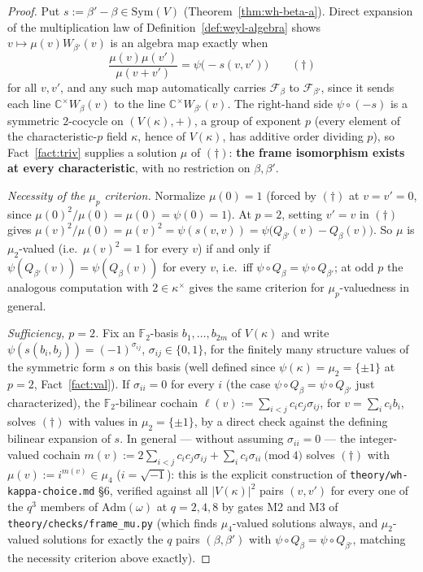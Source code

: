 \begin{proof}
Put $s:=\beta'-\beta\in\mathrm{Sym}(V)$ (Theorem~\ref{thm:wh-beta-a}). Direct
expansion of the multiplication law of Definition~\ref{def:weyl-algebra}
shows $v\mapsto\mu(v)W_{\beta'}(v)$ is an algebra map exactly when
\[
\frac{\mu(v)\mu(v')}{\mu(v+v')} = \psi\big({-}s(v,v')\big) \qquad(\dagger)
\]
for all $v,v'$, and any such map automatically carries $\mathcal{F}_\beta$
to $\mathcal{F}_{\beta'}$, since it sends each line
$\mathbb{C}^\times W_\beta(v)$ to the line $\mathbb{C}^\times W_{\beta'}(v)$.
The right-hand side $\psi\circ(-s)$ is a symmetric $2$-cocycle on
$(V(\kappa),+)$, a group of exponent $p$ (every element of the
characteristic-$p$ field $\kappa$, hence of $V(\kappa)$, has additive order
dividing $p$), so Fact~\ref{fact:triv} supplies a solution $\mu$ of
$(\dagger)$: \textbf{the frame isomorphism exists at every characteristic},
with no restriction on $\beta,\beta'$.

\emph{Necessity of the $\mu_p$ criterion.} Normalize $\mu(0)=1$ (forced by
$(\dagger)$ at $v=v'=0$, since $\mu(0)^2/\mu(0)=\mu(0)=\psi(0)=1$). At
$p=2$, setting $v'=v$ in $(\dagger)$ gives $\mu(v)^2/\mu(0)=\mu(v)^2=\psi(s(v,v))=\psi\big(Q_{\beta'}(v)-Q_\beta(v)\big)$.
So $\mu$ is $\mu_2$-valued (i.e.\ $\mu(v)^2=1$ for every $v$) if and only if
$\psi(Q_{\beta'}(v))=\psi(Q_\beta(v))$ for every $v$, i.e.\ iff
$\psi\circ Q_\beta=\psi\circ Q_{\beta'}$; at odd $p$ the analogous
computation with $2\in\kappa^\times$ gives the same criterion for
$\mu_p$-valuedness in general.

\emph{Sufficiency, $p=2$.} Fix an $\mathbb{F}_2$-basis $b_1,\dots,b_{2m}$ of
$V(\kappa)$ and write $\psi(s(b_i,b_j))=(-1)^{\sigma_{ij}}$,
$\sigma_{ij}\in\{0,1\}$, for the finitely many structure values of the
symmetric form $s$ on this basis (well defined since
$\psi(\kappa)=\mu_2=\{\pm 1\}$ at $p=2$, Fact~\ref{fact:val}). If
$\sigma_{ii}=0$ for every $i$ (the case $\psi\circ Q_\beta=\psi\circ Q_{\beta'}$
just characterized), the $\mathbb{F}_2$-bilinear cochain
$\ell(v):=\sum_{i<j}c_ic_j\sigma_{ij}$, for $v=\sum_i c_ib_i$, solves
$(\dagger)$ with values in $\mu_2=\{\pm 1\}$, by a direct check against the
defining bilinear expansion of $s$. In general — without assuming
$\sigma_{ii}=0$ — the integer-valued cochain
$m(v):=2\sum_{i<j}c_ic_j\sigma_{ij}+\sum_i c_i\sigma_{ii}\ \big(\mathrm{mod}\ 4\big)$
solves $(\dagger)$ with $\mu(v):=i^{m(v)}\in\mu_4$ ($i=\sqrt{-1}$): this is
the explicit construction of \texttt{theory\slash{}wh-kappa-choice.md} \S6,
verified against all $|V(\kappa)|^2$ pairs $(v,v')$ for every one of the
$q^3$ members of $\mathrm{Adm}(\omega)$ at $q=2,4,8$ by gates M2 and M3 of
\texttt{theory\slash{}checks\slash{}frame\_mu.py} (which finds $\mu_4$-valued solutions
always, and $\mu_2$-valued solutions for exactly the $q$ pairs $(\beta,\beta')$
with $\psi\circ Q_\beta=\psi\circ Q_{\beta'}$, matching the necessity
criterion above exactly).


\end{proof}
